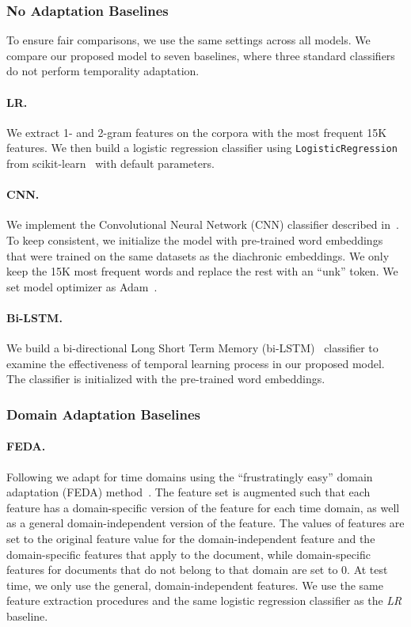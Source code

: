 \subsubsection{No Adaptation Baselines}
To ensure fair comparisons, we use the same settings across all models. We compare our proposed model to seven baselines, where three standard classifiers do not perform temporality adaptation.

\paragraph{LR.} 
We extract 1- and 2-gram features on the corpora with the most frequent 15K features. We then build a logistic regression classifier using \texttt{LogisticRegression} from scikit-learn~\cite{pedregosa2011scikit} with default parameters.

\paragraph{CNN.} 
We implement the Convolutional Neural Network (CNN) classifier described in~\cite{kim2014convolutional}. To keep consistent, we initialize the model with pre-trained word embeddings~\cite{bojanowski2017enriching} that were trained on the same datasets as the diachronic embeddings. We only keep the 15K most frequent words and replace the rest with an ``unk'' token. We set model optimizer as Adam~\cite{kingma2014adam}. 

\paragraph{Bi-LSTM.} 
We build a bi-directional Long Short Term Memory (bi-LSTM)~\cite{hochreiter1997long} classifier to examine the effectiveness of temporal learning process in our proposed model. The classifier is initialized with the pre-trained word embeddings.

\subsubsection{Domain Adaptation Baselines}

\paragraph{FEDA.} 
Following \cite{huang2018examining} we adapt for time domains using the ``frustratingly easy'' domain adaptation (FEDA) method~\cite{daume2007frustratingly}. 
The feature set is augmented such that each feature has a domain-specific version of the feature for each time domain, as well as a general domain-independent version of the feature.
The values of features are set to the original feature value for the domain-independent feature and the domain-specific features that apply to the document, while domain-specific features for documents that do not belong to that domain are set to $0$.
At test time, we only use the general, domain-independent features. 
We use the same feature extraction procedures and the same logistic regression classifier as the \textit{LR} baseline.

